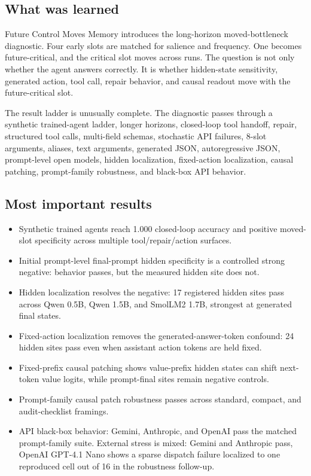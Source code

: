\documentclass[11pt]{article}
\begin{document}
\subsection{What was learned}

Future Control Moves Memory introduces the long-horizon moved-bottleneck
diagnostic. Four early slots are matched for salience and frequency. One
becomes future-critical, and the critical slot moves across runs. The question
is not only whether the agent answers correctly. It is whether hidden-state
sensitivity, generated action, tool call, repair behavior, and causal readout
move with the future-critical slot.

The result ladder is unusually complete. The diagnostic passes through a
synthetic trained-agent ladder, longer horizons, closed-loop tool handoff,
repair, structured tool calls, multi-field schemas, stochastic API failures,
8-slot arguments, aliases, text arguments, generated JSON, autoregressive JSON,
prompt-level open models, hidden localization, fixed-action localization,
causal patching, prompt-family robustness, and black-box API behavior.

\subsection{Most important results}

\begin{itemize}
  \item Synthetic trained agents reach 1.000 closed-loop accuracy and positive
  moved-slot specificity across multiple tool/repair/action surfaces.
  \item Initial prompt-level final-prompt hidden specificity is a controlled
  strong negative: behavior passes, but the measured hidden site does not.
  \item Hidden localization resolves the negative: 17 registered hidden sites
  pass across Qwen 0.5B, Qwen 1.5B, and SmolLM2 1.7B, strongest at generated
  final states.
  \item Fixed-action localization removes the generated-answer-token confound:
  24 hidden sites pass even when assistant action tokens are held fixed.
  \item Fixed-prefix causal patching shows value-prefix hidden states can shift
  next-token value logits, while prompt-final sites remain negative controls.
  \item Prompt-family causal patch robustness passes across standard, compact,
  and audit-checklist framings.
  \item API black-box behavior: Gemini, Anthropic, and OpenAI pass the matched
  prompt-family suite. External stress is mixed: Gemini and Anthropic pass,
  OpenAI GPT-4.1 Nano shows a sparse dispatch failure localized to one
  reproduced cell out of 16 in the robustness follow-up.
\end{itemize}
\end{document}
